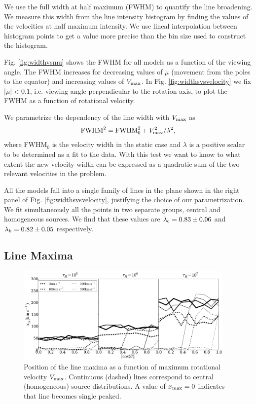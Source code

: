\documentclass{emulateapj}
\begin{document}
We use the full width at half maximum (FWHM) to quantify the line
broadening. 
We measure this width from the line intensity histogram by finding the
values of the velocities at half maximum intensity.
We use lineal interpolation between histogram points to get a value
more precise than the bin size used to construct the histogram. 

Fig. \ref{fig:widthvsmu} shows the FWHM for all models as a function
of the viewing angle. 
The FWHM increases for decreasing values of $\mu$ (movement from the
poles to the equator) and increasing values of $V_{\rm max}$. 
In Fig.
\ref{fig:widthsvsvelocity} we fix $|\mu|<0.1$, i.e. viewing angle
perpendicular to the rotation axis, to plot the FWHM as a function of
rotational velocity.  


We parametrize the dependency of the line width with  $V_{\rm max}$ as
%
\begin{equation}
 {\rm FWHM}^2 = {\rm FWHM}_{0}^2 + V_{\rm max}^2/\lambda^2,
\label{eq:fwhm}
\end{equation}
%
where FWHM$_{0}$ is the velocity width in the static case and $\lambda$ 
is a positive scalar to be determined as a fit to the data.  
With this test we want to know to what extent the new velocity width can be
expressed as a quadratic sum of the two relevant velocities in the
problem. 

All the models fall into a single family of lines in the plane shown
in the right panel of Fig. \ref{fig:widthsvsvelocity}, justifying
the choice of our parametrization.
We fit simultaneously all the points in two separate groups, central
and homogeneous sources.
We find that these values are $\lambda_{\rm c} = 0.83 \pm 0.06$ and
$\lambda_{\rm    h}= 0.82\pm 0.05$ respectively.    


\subsection{Line Maxima}
\label{sec:maxima}

\begin{figure}
\begin{center}
  \includegraphics[width=0.95\textwidth]{f8.pdf}
\end{center}
\caption{Position of the line maxima as a function of maximum
  rotational   velocity $V_{\rm max}$. Continuous (dashed) lines
  correspond to   central (homogeneous) source distributions. A value
  of $x_{\rm     max}=0$ indicates that line becomes single
  peaked. \label{fig:maximumvsvelocity}}
\end{figure}
\end{document}
